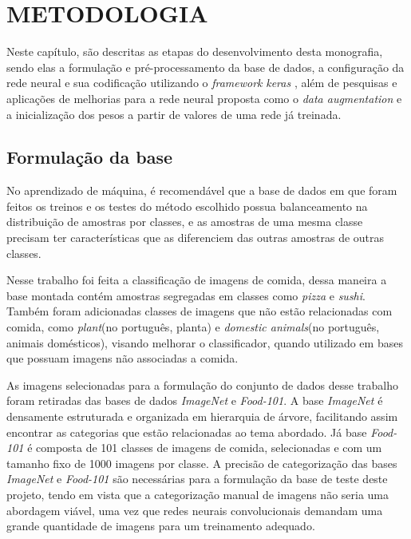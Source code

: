 
\chapter{METODOLOGIA}
\label{chap:metodologia}
Neste capítulo, são descritas as etapas do desenvolvimento desta monografia, sendo elas a formulação e pré-processamento da base de dados, a configuração da rede neural e sua codificação utilizando o \textit{framework} \textit{keras} \cite{chollet2015keras}, além de pesquisas e aplicações de melhorias para a rede neural proposta como o \textit{data augmentation} e a inicialização dos pesos a partir de valores de uma rede já treinada.

\section{Formulação da base}
No aprendizado de máquina, é recomendável que a base de dados em que foram feitos os treinos e os testes do método escolhido possua balanceamento na distribuição de amostras por classes, e as amostras de uma mesma classe precisam ter características que as diferenciem das outras amostras de outras classes.

\par Nesse trabalho foi feita a classificação de imagens de comida, dessa maneira a base montada contém amostras segregadas em classes como \textit{pizza} e \textit{sushi}. Também foram adicionadas classes de imagens que não estão relacionadas com comida, como \textit{plant}(no português, planta) e \textit{domestic animals}(no português, animais domésticos), visando melhorar o classificador, quando utilizado em bases que possuam imagens não associadas a comida.
\par As imagens selecionadas para a formulação do conjunto de dados desse trabalho foram retiradas das bases de dados \textit{ImageNet}\cite{deng2009imagenet} e \textit{Food-101}\cite{bossard14}. A base \textit{ImageNet} é densamente estruturada e organizada em hierarquia de árvore, facilitando assim encontrar as categorias que estão relacionadas ao tema abordado. Já base \textit{Food-101} é composta de 101 classes de imagens de comida, selecionadas e com um tamanho fixo de 1000 imagens por classe. A precisão de categorização das bases \textit{ImageNet} e \textit{Food-101} são necessárias para a formulação da base de teste deste projeto, tendo em vista que a categorização manual de imagens não seria uma abordagem viável, uma vez que redes neurais convolucionais demandam uma grande quantidade de imagens para um treinamento adequado.  


